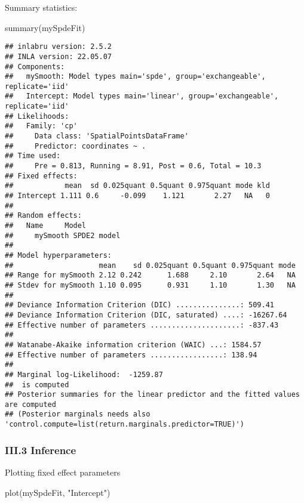 \documentclass[
]{article}
\newenvironment{Shaded}{\begin{snugshade}}{\end{snugshade}}
\newcommand{\FunctionTok}[1]{\textcolor[rgb]{0.00,0.00,0.00}{#1}}
\newcommand{\NormalTok}[1]{#1}
\newcommand{\StringTok}[1]{\textcolor[rgb]{0.31,0.60,0.02}{#1}}
\begin{document}
Summary statistics:

\begin{Shaded}
\begin{Highlighting}[]
\FunctionTok{summary}\NormalTok{(mySpdeFit)}
\end{Highlighting}
\end{Shaded}

\begin{verbatim}
## inlabru version: 2.5.2
## INLA version: 22.05.07
## Components:
##   mySmooth: Model types main='spde', group='exchangeable', replicate='iid'
##   Intercept: Model types main='linear', group='exchangeable', replicate='iid'
## Likelihoods:
##   Family: 'cp'
##     Data class: 'SpatialPointsDataFrame'
##     Predictor: coordinates ~ .
## Time used:
##     Pre = 0.813, Running = 8.91, Post = 0.6, Total = 10.3 
## Fixed effects:
##            mean  sd 0.025quant 0.5quant 0.975quant mode kld
## Intercept 1.111 0.6     -0.099    1.121       2.27   NA   0
## 
## Random effects:
##   Name     Model
##     mySmooth SPDE2 model
## 
## Model hyperparameters:
##                    mean    sd 0.025quant 0.5quant 0.975quant mode
## Range for mySmooth 2.12 0.242      1.688     2.10       2.64   NA
## Stdev for mySmooth 1.10 0.095      0.931     1.10       1.30   NA
## 
## Deviance Information Criterion (DIC) ...............: 509.41
## Deviance Information Criterion (DIC, saturated) ....: -16267.64
## Effective number of parameters .....................: -837.43
## 
## Watanabe-Akaike information criterion (WAIC) ...: 1584.57
## Effective number of parameters .................: 138.94
## 
## Marginal log-Likelihood:  -1259.87 
##  is computed 
## Posterior summaries for the linear predictor and the fitted values are computed
## (Posterior marginals needs also 'control.compute=list(return.marginals.predictor=TRUE)')
\end{verbatim}

\hypertarget{iii.3-inference}{%
\subsubsection{III.3 Inference}\label{iii.3-inference}}

Plotting fixed effect parameters

\begin{Shaded}
\begin{Highlighting}[]
\FunctionTok{plot}\NormalTok{(mySpdeFit, }\StringTok{"Intercept"}\NormalTok{)}
\end{Highlighting}
\end{Shaded}
\end{document}
